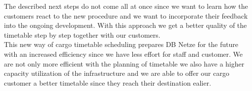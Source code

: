 The described next steps do not come all at once since we want to learn how the customers react to the new procedure and we want to incorporate their feedback into the ongoing development. With this approach we get a better quality of the timetable step by step together with our customers. \\
This new way of cargo timetable scheduling prepares DB Netze for the future with an increased efficiency since we have less effort for staff and customer. We are not only more efficient with the planning of timetable we also have a higher capacity utilization of the infrastructure and we are able to offer our cargo customer a better timetable since they reach their destination ealier.   \\

